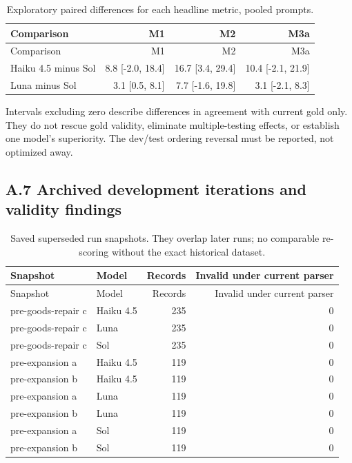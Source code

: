 \documentclass[11pt,a4paper]{article}
\begin{document}
\begingroup\small\setlength{\tabcolsep}{4pt}
\begin{longtable}{lrrr}
\caption{Exploratory paired differences for each headline metric, pooled prompts.}\\
\toprule
Comparison & M1 & M2 & M3a \\
\midrule\endfirsthead
\toprule
Comparison & M1 & M2 & M3a \\
\midrule\endhead
\bottomrule\endfoot
Haiku 4.5 minus Sol & 8.8 [-2.0, 18.4] & 16.7 [3.4, 29.4] & 10.4 [-2.1, 21.9] \\
Luna minus Sol & 3.1 [0.5, 8.1] & 7.7 [-1.6, 19.8] & 3.1 [-2.1, 8.3] \\
\end{longtable}\endgroup


Intervals excluding zero describe differences in agreement with current gold only. They do not rescue gold validity, eliminate multiple-testing effects, or establish one model's superiority. The dev/test ordering reversal must be reported, not optimized away.

\subsection*{A.7 Archived development iterations and validity findings}

\begingroup\small\setlength{\tabcolsep}{4pt}
\begin{longtable}{llrr}
\caption{Saved superseded run snapshots. They overlap later runs; no comparable re-scoring without the exact historical dataset.}\\
\toprule
Snapshot & Model & Records & Invalid under current parser \\
\midrule\endfirsthead
\toprule
Snapshot & Model & Records & Invalid under current parser \\
\midrule\endhead
\bottomrule\endfoot
pre-goods-repair c & Haiku 4.5 & 235 & 0 \\
pre-goods-repair c & Luna & 235 & 0 \\
pre-goods-repair c & Sol & 235 & 0 \\
pre-expansion a & Haiku 4.5 & 119 & 0 \\
pre-expansion b & Haiku 4.5 & 119 & 0 \\
pre-expansion a & Luna & 119 & 0 \\
pre-expansion b & Luna & 119 & 0 \\
pre-expansion a & Sol & 119 & 0 \\
pre-expansion b & Sol & 119 & 0 \\
\end{longtable}\endgroup
\end{document}
